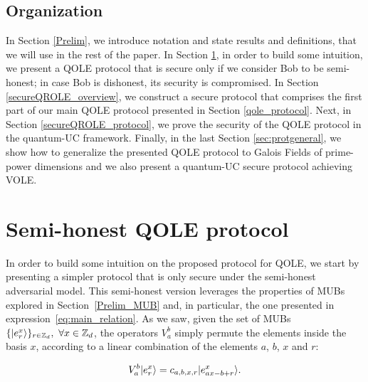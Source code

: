 \subsection{Organization}\label{Intro_organization}
 In Section \ref{Prelim}, we introduce notation and state results and definitions, that we will use in the rest of the paper. In Section \ref{insecureQOLE}, in order to build some intuition, we present a QOLE protocol that is secure only if we consider Bob to be semi-honest; in case Bob is dishonest, its security is compromised. In Section \ref{secureQROLE_overview}, we construct a secure protocol that comprises the first part of our main QOLE protocol presented in Section \ref{qole_protocol}. Next, in Section \ref{secureQROLE_protocol}, we prove the security of the QOLE protocol in the quantum-UC framework.   Finally, in the last Section \ref{sec:protgeneral}, we show how to generalize the presented QOLE protocol to  Galois Fields of prime-power dimensions and we also present a quantum-UC secure protocol achieving VOLE.



\section{Semi-honest QOLE protocol}\label{insecureQOLE}

 In order to build some intuition on the proposed protocol for QOLE, we start by presenting a simpler protocol that is only secure under the semi-honest adversarial model. This semi-honest version leverages the properties of MUBs explored in Section~\ref{Prelim_MUB} and, in particular, the one presented in expression~\eqref{eq:main_relation}. As we saw, given the set of MUBs $\{ | e^x_r \rangle \}_{r\in\mathbb{Z}_d},\ \forall x\in\mathbb{Z}_d$, the operators $V^b_a$ simply permute the elements inside the basis $x$, according to a linear combination of the elements $a$, $b$, $x$ and $r$:

\begin{equation}
V^b_a | e^x_r \rangle = c_{a, b, x, r} | e^x_{ax - b +r} \rangle.
\label{eq:main_ingredient}
\end{equation}

